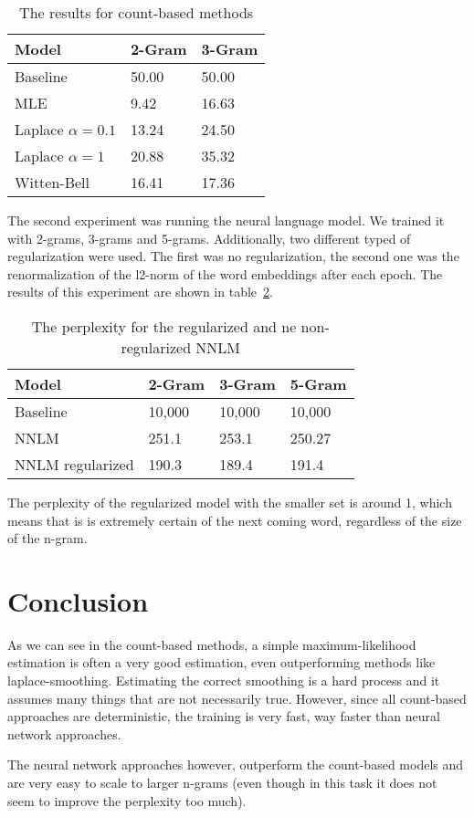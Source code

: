 \documentclass[11pt]{article}
\begin{document}
\begin{table}[ht]
\centering
\begin{tabular}{@{}lll@{}}
\toprule
Model                & 2-Gram & 3-Gram \\ \midrule
Baseline             & 50.00  & 50.00  \\ \midrule
MLE                  & 9.42   & 16.63  \\
Laplace $\alpha=0.1$ & 13.24  & 24.50  \\
Laplace $\alpha=1$   & 20.88  & 35.32  \\
Witten-Bell          & 16.41  & 17.36 
\end{tabular}
\caption{The results for count-based methods}
\label{tab:count}
\end{table}

The second experiment was running the neural language model. We trained it with 2-grams, 3-grams and 5-grams. Additionally, two different typed of regularization were used. The first was no regularization, the second one was the renormalization of the l2-norm of the word embeddings after each epoch. The results of this experiment are shown in table~\ref{tab:nn}.

\begin{table}[ht]
\centering
\begin{tabular}{@{}llll@{}}
\toprule
Model            & 2-Gram & 3-Gram & 5-Gram \\ \midrule
Baseline         & 10,000 & 10,000 & 10,000 \\ \midrule
NNLM             & 251.1  & 253.1  & 250.27 \\
NNLM regularized & 190.3  & 189.4  & 191.4  \\ \bottomrule
\end{tabular}
\caption{The perplexity for the regularized and ne non-regularized NNLM}
\label{tab:nn}
\end{table}

The perplexity of the regularized model with the smaller set is around 1, which means that is is extremely certain of the next coming word, regardless of the size of the n-gram.


\section{Conclusion}

As we can see in the count-based methods, a simple maximum-likelihood estimation is often a very good estimation, even outperforming methods like laplace-smoothing. Estimating the correct smoothing is a hard process and it assumes many things that are not necessarily true. However, since all count-based approaches are deterministic, the training is very fast, way faster than neural network approaches. 

The neural network approaches however, outperform the count-based models and are very easy to scale to larger n-grams (even though in this task it does not seem to improve the perplexity too much).




\end{document}
